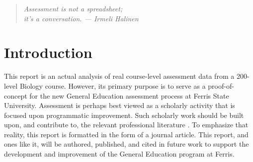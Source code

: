 \documentclass[fleqn,10pt]{SelfArx}\usepackage[]{graphicx}\usepackage[]{color}
\affiliation{\textsuperscript{1}\textit{General Education Coordinator, Ferris State University}} %
\begin{document}
\flushbottom %

\maketitle %

\tableofcontents %

{
	\fancyhf{}
}
\thispagestyle{firststyle}











\begin{quote}
\begin{center}
\textit{Assessment is not a spreadsheet; \\ it's a conversation. --- Irmeli Halinen}
\end{center}
\end{quote}

\section{Introduction} %

This report is an actual analysis of real course-level assessment data from a 200-level Biology course. However, its primary purpose is to serve as a proof-of-concept for the new General Education assessment process at Ferris State University. Assessment is perhaps best viewed as a scholarly activity that is focused upon programmatic improvement. Such scholarly work should be built upon, and contribute to, the relevant professional literature \citep{Weimer2015}. To emphasize that reality, this report is formatted in the form of a journal article. This report, and ones like it, will be authored, published, and cited in future work to support the development and improvement of the General Education program at Ferris.
\end{document}
